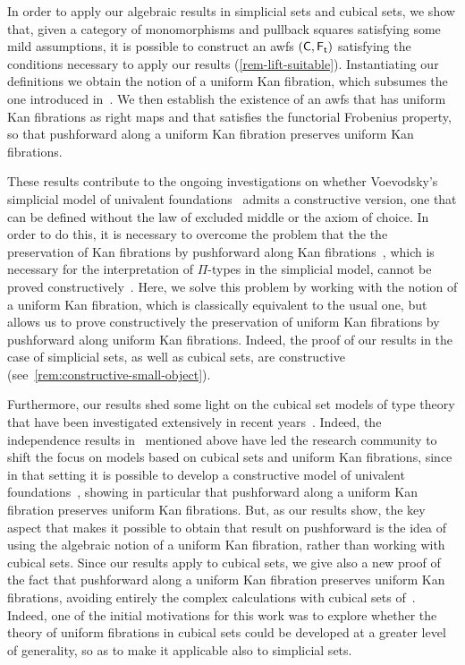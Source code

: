 \documentclass[reqno,10pt,a4paper,oneside,draft]{amsart}
\begin{document}
In order to apply our algebraic results in simplicial sets and cubical sets, we show that, given a category of monomorphisms and pullback squares satisfying some mild assumptions, it is possible to construct an awfs $(\mathsf{C}, \mathsf{F_t})$ satisfying the conditions necessary to apply our results (\cref{rem-lift-suitable}).
Instantiating our definitions we obtain the notion of a uniform Kan fibration, which subsumes the one introduced in~\cite{cohen-et-al:cubicaltt}.
We then establish the existence of an awfs that has uniform Kan fibrations as right maps and that satisfies the functorial Frobenius property, so that pushforward along a uniform Kan fibration preserves uniform Kan fibrations.


These results contribute to the ongoing investigations on whether Voevodsky's simplicial model of univalent foundations~\cite{voevodsky-simplicial-model} admits a constructive version, \ie one that can be defined without the law of excluded middle or the axiom of choice. In order to do this, it is necessary to overcome the problem that the 
the preservation of Kan fibrations by pushforward along Kan fibrations~\cite[Lemma~2.3.1]{voevodsky-simplicial-model}, 
which is necessary for the interpretation of
$\Pi$-types in the simplicial model, cannot be proved constructively~\cite[Section~6]{coquand-non-constructivity-kan}. Here, we solve this problem by working with the notion of a uniform Kan fibration, which is classically equivalent to the usual one, but allows us to prove constructively the preservation of uniform Kan fibrations by pushforward along uniform Kan fibrations. Indeed, the proof of our results in  the case of simplicial sets, as well as cubical sets, are constructive (see~\cref{rem:constructive-small-object}).

Furthermore, our results  shed some light on the cubical set models of type theory that have been
investigated extensively in recent years~\cite{awodey-cubical,coquand-cubical-sets,cohen-et-al:cubicaltt,pitts-cubical-nominal,swan-awfs}. Indeed, the independence results in~\cite{coquand-non-constructivity-kan} mentioned above have led the research community to shift the focus on models based on cubical sets and uniform Kan fibrations, since in that setting it is possible to develop a constructive model of univalent foundations~\cite{cohen-et-al:cubicaltt}, showing in particular that pushforward along a uniform Kan fibration preserves uniform Kan fibrations. But, as our results show, the key aspect that makes it possible to obtain that result on pushforward is the idea of using the algebraic notion of a uniform Kan fibration, rather than working with cubical sets. Since our results apply to cubical sets, we give also a new proof of the fact that pushforward along a uniform Kan fibration preserves uniform Kan fibrations, avoiding entirely the complex calculations with cubical sets of~\cite{cohen-et-al:cubicaltt,huber-thesis}.
Indeed, one of the initial motivations for this work was to explore whether the theory of uniform fibrations in cubical sets could be developed at a greater level of generality, so as to make it applicable also to simplicial sets.
\end{document}
